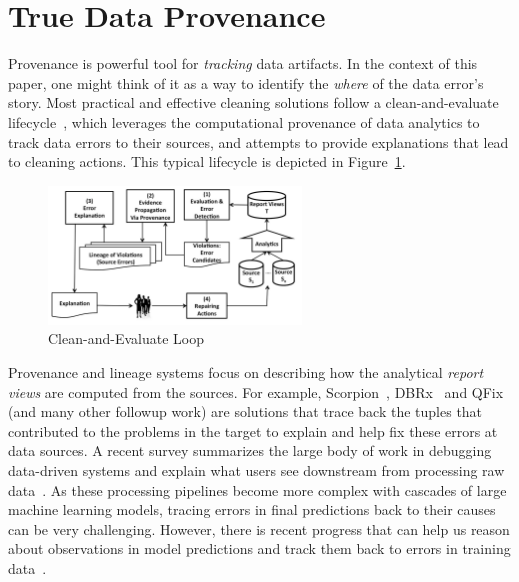 \section{True Data Provenance}
\label{sec:provenance}

Provenance is powerful tool for {\em tracking} data artifacts. In the context of this paper, one might think of it as a way to identify the \emph{where} of the data error's story. Most practical and effective cleaning solutions follow a clean-and-evaluate lifecycle~\cite{Ilyas16DE}, which leverages the computational provenance of data analytics to track data errors to their sources, and attempts to provide explanations that lead to cleaning actions. This typical lifecycle is depicted in Figure~\ref{fig:lifecycle}. 
\begin{figure}[ht]
  \centering
  \includegraphics[width=0.6\textwidth]{lifecycle}
  \caption{Clean-and-Evaluate Loop~\cite{Ilyas16DE}}
  \label{fig:lifecycle}
\end{figure}

Provenance and lineage systems focus on describing how the analytical {\em report views} are computed from the sources. For example, Scorpion~\cite{DBLP:journals/pvldb/0002M13}, DBRx~\cite{DBLP:conf/sigmod/ChalamallaIOP14} and QFix~\cite{DBLP:conf/sigmod/WangM017} (and many other followup work) are  solutions that trace back the tuples that contributed to the problems in the target to explain and help fix these errors at data sources. A recent survey summarizes the large body of work in debugging data-driven systems and explain what users see downstream from processing raw data~\cite{DBLP:journals/ftdb/GlavicMR21}. As these processing pipelines become more complex with cascades of large machine learning models, tracing errors in final predictions back to their causes can be very challenging. However, there is recent progress that can help us reason about observations in model predictions and track them back to errors in training data~\cite{DBLP:journals/corr/abs-2202-00622}.

